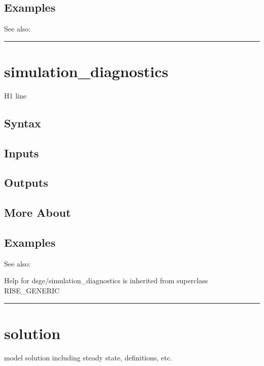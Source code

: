 \documentclass[letterpaper,10pt,english]{sphinxmanual}
\begin{document}
\subsection{Examples}
\label{classes/models/@dsge/dsge:id201}
See also:


\bigskip\hrule{}\bigskip



\section{simulation\_diagnostics}
\label{classes/models/@dsge/dsge:id202}\label{classes/models/@dsge/dsge:simulation-diagnostics}
H1 line


\subsection{Syntax}
\label{classes/models/@dsge/dsge:id203}

\subsection{Inputs}
\label{classes/models/@dsge/dsge:id204}

\subsection{Outputs}
\label{classes/models/@dsge/dsge:id205}

\subsection{More About}
\label{classes/models/@dsge/dsge:id206}

\subsection{Examples}
\label{classes/models/@dsge/dsge:id207}
See also:

Help for dsge/simulation\_diagnostics is inherited from superclass RISE\_GENERIC


\bigskip\hrule{}\bigskip



\section{solution}
\label{classes/models/@dsge/dsge:id208}\label{classes/models/@dsge/dsge:solution}
model solution including steady state, definitions, etc.
\end{document}
